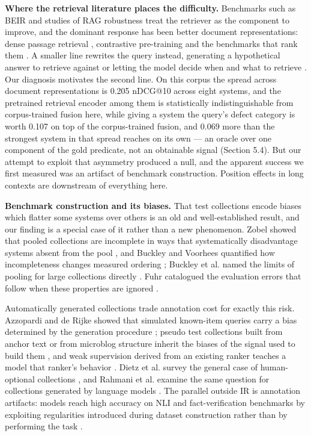\documentclass[runningheads]{llncs}
\begin{document}
\textbf{Where the retrieval literature places the difficulty.} Benchmarks such as BEIR \cite{thakur2021beir} and studies of RAG robustness \cite{chen2023benchmarkingrag} treat the retriever as the component to improve, and the dominant response has been better document representations: dense passage retrieval \cite{karpukhin2020dpr}, contrastive pre-training \cite{izacard2021contriever,wang2022e5} and the benchmarks that rank them \cite{muennighoff2022mteb}. A smaller line rewrites the query instead, generating a hypothetical answer to retrieve against \cite{gao2022hyde} or letting the model decide when and what to retrieve \cite{asai2023selfrag}. Our diagnosis motivates the second line. On this corpus the spread across document representations is 0.205 nDCG@10 across eight systems, and the pretrained retrieval encoder among them is statistically indistinguishable from corpus-trained fusion here, while giving a system the query's defect category is worth 0.107 on top of the corpus-trained fusion, and 0.069 more than the strongest system in that spread reaches on its own --- an oracle over one component of the gold predicate, not an obtainable signal (Section 5.4). But our attempt to exploit that asymmetry produced a null, and the apparent success we first measured was an artifact of benchmark construction. Position effects in long contexts \cite{liu2023lostinmiddle} are downstream of everything here.

\textbf{Benchmark construction and its biases.} That test collections encode biases which flatter some systems over others is an old and well-established result, and our finding is a special case of it rather than a new phenomenon. Zobel showed that pooled collections are incomplete in ways that systematically disadvantage systems absent from the pool \cite{zobel1998reliable}, and Buckley and Voorhees quantified how incompleteness changes measured ordering \cite{buckley2004incomplete}; Buckley et al. named the limits of pooling for large collections directly \cite{buckley2007bias}. Fuhr catalogued the evaluation errors that follow when these properties are ignored \cite{fuhr2017mistakes}.

Automatically generated collections trade annotation cost for exactly this risk. Azzopardi and de Rijke showed that simulated known-item queries carry a bias determined by the generation procedure \cite{azzopardi2007simulated}; pseudo test collections built from anchor text or from microblog structure inherit the biases of the signal used to build them \cite{asadi2011pseudo,berendsen2013pseudo}, and weak supervision derived from an existing ranker teaches a model that ranker's behavior \cite{dehghani2017weak}. Dietz et al. survey the general case of human-optional collections \cite{dietz2020humansoptional}, and Rahmani et al. examine the same question for collections generated by language models \cite{rahmani2024synthetic}. The parallel outside IR is annotation artifacts: models reach high accuracy on NLI and fact-verification benchmarks by exploiting regularities introduced during dataset construction rather than by performing the task \cite{gururangan2018artifacts,schuster2019fever}.
\end{document}
